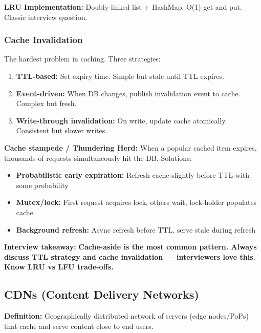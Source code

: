 \documentclass[11pt]{article}
\providecommand{\tightlist}{\setlength{\itemsep}{1pt}\setlength{\parskip}{0pt}}
\begin{document}
\textbf{LRU Implementation:} Doubly-linked list + HashMap. O(1) get and put. Classic interview question.

\subsubsection{Cache Invalidation}\label{cache-invalidation}

The hardest problem in caching. Three strategies:

\begin{enumerate}
\def\labelenumi{\arabic{enumi}.}
\tightlist
\item
  \textbf{TTL-based:} Set expiry time. Simple but stale until TTL expires.
\item
  \textbf{Event-driven:} When DB changes, publish invalidation event to cache. Complex but fresh.
\item
  \textbf{Write-through invalidation:} On write, update cache atomically. Consistent but slower writes.
\end{enumerate}

\textbf{Cache stampede / Thundering Herd:} When a popular cached item expires, thousands of requests simultaneously hit the DB. Solutions:

\begin{itemize}
\tightlist
\item
  \textbf{Probabilistic early expiration:} Refresh cache slightly before TTL with some probability
\item
  \textbf{Mutex/lock:} First request acquires lock, others wait, lock-holder populates cache
\item
  \textbf{Background refresh:} Async refresh before TTL, serve stale during refresh
\end{itemize}

\textbf{Interview takeaway:} \textbf{Cache-aside is the most common pattern. Always discuss TTL strategy and cache invalidation --- interviewers love this. Know LRU vs LFU trade-offs.}

\subsection{CDNs (Content Delivery Networks)}\label{cdns-content-delivery-networks}

\textbf{Definition:} Geographically distributed network of servers (edge nodes/PoPs) that cache and serve content close to end users.

\setcodelang{}
\end{document}

